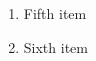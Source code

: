 \documentclass{article}
\begin{document}
\begin{enumerate}[start=5]
\item Fifth item
\item Sixth item
\end{enumerate}
\end{document}
